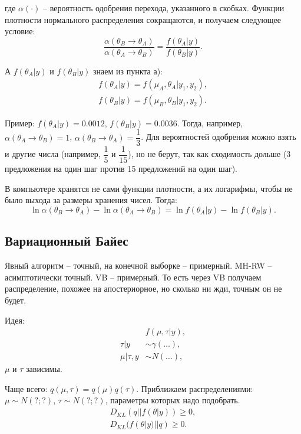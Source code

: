 \documentclass[10pt, a4paper]{extarticle}
\begin{document}
где $\alpha(\cdot)$ -- вероятность одобрения перехода, указанного в скобках. Функции плотности нормального распределения сокращаются, и получаем следующее условие:
\[
\dfrac{\alpha(\theta_B \rightarrow \theta_A)}{\alpha(\theta_A \rightarrow \theta_B)} = \dfrac{f(\theta_A|y)}{f(\theta_B|y)}.
\]

А $f(\theta_A|y)$ и $f(\theta_B|y)$ знаем из пункта а): 
\begin{align*}
f(\theta_A|y) = f(\mu_A, \theta_A|y_1, y_2), \\
f(\theta_B|y) = f(\mu_B, \theta_B|y_1, y_2).
\end{align*}

Пример: $f(\theta_A|y) = 0.0012$, $f(\theta_B|y) = 0.0036$. Тогда, например, $\alpha(\theta_A \rightarrow \theta_B) = 1$, $\alpha(\theta_B \rightarrow \theta_A) = \dfrac{1}{3}$. Для вероятностей одобрения можно взять и другие числа (например, $\dfrac{1}{5}$ и $\dfrac{1}{15}$), но не берут, так как сходимость дольше (3 предложения на один шаг против 15 предложений на один шаг).

В компьютере хранятся не сами функции плотности, а их логарифмы, чтобы не было выхода за размеры хранения чисел. Тогда:
\[
\ln\alpha(\theta_B \rightarrow \theta_A) - \ln\alpha(\theta_A \rightarrow \theta_B) = \ln f(\theta_A|y) - \ln f(\theta_B|y).
\]

\subsection{Вариационный Байес}

Явный алгоритм -- точный, на конечной выборке -- примерный. MH-RW -- асимптотически точный. VB -- примерный. То есть через VB получаем распределение, похожее на апостериорное, но сколько ни жди, точным он не будет.

Идея:
\begin{align*}
	&f(\mu, \tau | y), \\
	\tau | y &\sim \gamma(\ldots), \\
	\mu | \tau, y &\sim N(\ldots),
\end{align*}
$\mu$ и $\tau$ зависимы.

Чаще всего: $q(\mu, \tau) = q(\mu)q(\tau)$.
Приближаем распределениями: $\mu \sim N(?; ?)$, $\tau \sim N(?; ?)$, параметры которых надо подобрать.
\begin{align*}
	D_{KL}(q||f(\theta|y)) \ge 0, \\
	D_{KL}(f(\theta|y)||q) \ge 0. 
\end{align*}
\end{document}
